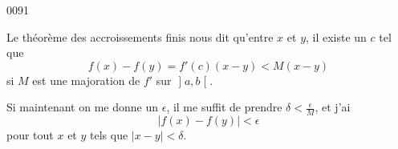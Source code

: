 
\begin{corrige}{0091}

Le théorème des accroissements finis nous dit qu'entre $x$ et $y$, il existe un $c$ tel que
\begin{equation}
	f(x)-f(y)=f'(c)(x-y)<M(x-y)
\end{equation}
si $M$ est une majoration de $f'$ sur $\mathopen]a,b\mathclose[$.

Si maintenant on me donne un $\epsilon$, il me suffit de prendre $\delta<\frac{ \epsilon }{ M }$, et j'ai
\begin{equation}
	| f(x)-f(y) |<\epsilon
\end{equation}
pour tout $x$ et $y$ tels que $| x-y |<\delta$.

\end{corrige}
